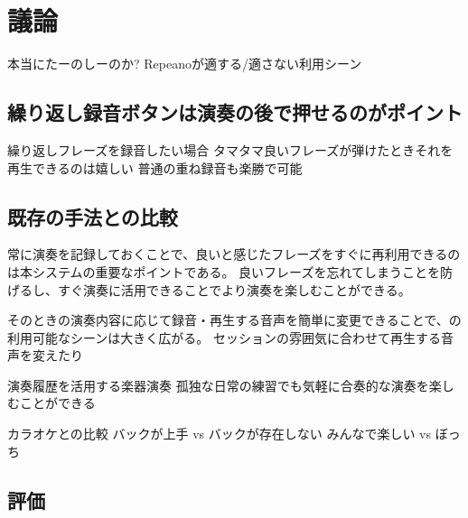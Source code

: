 \section{議論}

本当にたーのしーのか?
Repeanoが適する/適さない利用シーン

\subsection{繰り返し録音ボタンは演奏の後で押せるのがポイント}
繰り返しフレーズを録音したい場合
タマタマ良いフレーズが弾けたときそれを再生できるのは嬉しい
普通の重ね録音も楽勝で可能

\subsection{既存の手法との比較}





常に演奏を記録しておくことで、良いと感じたフレーズをすぐに再利用できるのは本システムの重要なポイントである。
良いフレーズを忘れてしまうことを防げるし、すぐ演奏に活用できることでより演奏を楽しむことができる。

そのときの演奏内容に応じて録音・再生する音声を簡単に変更できることで、{\system}の利用可能なシーンは大きく広がる。
セッションの雰囲気に合わせて再生する音声を変えたり

演奏履歴を活用する楽器演奏
孤独な日常の練習でも気軽に合奏的な演奏を楽しむことができる

カラオケとの比較
バックが上手 vs バックが存在しない
みんなで楽しい vs ぼっち

\subsection{評価}

